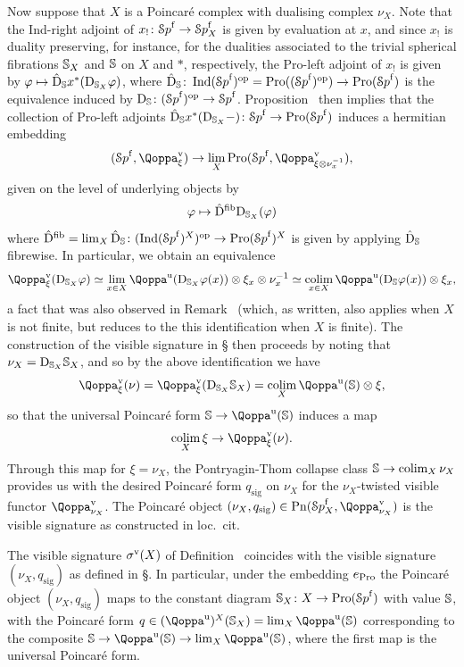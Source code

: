 Now suppose that $X$ is a Poincaré complex with dualising complex $\nu_X$. Note that the Ind-right adjoint of $x_!\colon {\mathcal Sp}^{\mathrm{f}} \to {\mathcal Sp}^{\mathrm{f}}_X$ is given by evaluation at $x$, and since $x_!$ is duality preserving, for instance, for the dualities associated to the trivial spherical fibrations $\mathbb{S}_X$ and $\mathbb{S}$ on $X$ and $*$, respectively, the Pro-left adjoint of $x_!$ is given by $\varphi \mapsto \hat{\mathrm{D}}_{\mathbb{S}}x^*(\mathrm{D}_{\mathbb{S}_X}\varphi)$, where $\hat{\mathrm{D}}_{\mathbb{S}}\colon \operatorname{Ind}({\mathcal Sp}^{\mathrm{f}})^\mathrm{op} = \operatorname{Pro}(({\mathcal Sp}^{\mathrm{f}})^\mathrm{op}) \to \operatorname{Pro}({\mathcal Sp}^{\mathrm{f}})$ is the equivalence induced by $\mathrm{D}_{\mathbb{S}}\colon ({\mathcal Sp}^{\mathrm{f}})^\mathrm{op} \to {\mathcal Sp}^{\mathrm{f}}$. Proposition~ then implies that the collection of Pro-left adjoints $\hat{\mathrm{D}}_{\mathbb{S}}x^*(\mathrm{D}_{\mathbb{S}_X}-)\colon {\mathcal Sp}^{\mathrm{f}} \to \operatorname{Pro}({\mathcal Sp}^{\mathrm{f}})$ induces a hermitian embedding
\[
(\Spaf,\QF^{\vis}_{\xi}) \to \lim_X \Pro(\Spaf,\QF^{\vis}_{\xi\otimes\nu_x^{-1}}) ,
\]
given on the level of underlying objects by
\begin{equation}
\label{equation:ind-to-pro}%
\vphi \mapsto \hat{\Dual}^{\fib}\Dual_{\SS_X}(\vphi) 
\end{equation}
where $\hat{\mathrm{D}}^{\operatorname{fib}} = \lim_X \hat{\mathrm{D}}_{\mathbb{S}}\colon (\operatorname{Ind}({\mathcal Sp}^{\mathrm{f}})^X)^\mathrm{op} \to \operatorname{Pro}({\mathcal Sp}^{\mathrm{f}})^X$ is given by applying $\hat{\mathrm{D}}_{\mathbb{S}}$ fibrewise.
In particular, we obtain an equivalence
\[
\QF^{\vis}_{\xi}(\Dual_{\SS_X}\vphi) \simeq \lim_{x \in X} \QF^{\uni}(\Dual_{\SS_X}\vphi(x))\otimes \xi_x \otimes \nu_x^{-1} \simeq \colim_{x \in X}\QF^{\uni}(\Dual_{\SS}\vphi(x))\otimes \xi_x,
\]
a fact that was also observed in Remark~ (which, as written, also applies when $X$ is not finite, but reduces to the this identification when $X$ is finite). The construction of the visible signature in \S{} then proceeds by noting that $\nu_X = \mathrm{D}_{\mathbb{S}_X}\mathbb{S}_X$, and so by the above identification we have
\[
\QF^{\vis}_{\xi}(\nu) = \QF^{\vis}_{\xi}(\Dual_{\SS_X}\SS_X) = \colim_{X}\QF^{\uni}(\SS)\otimes \xi ,
\]
so that the universal Poincaré form $\SS \to \QF^{\uni}(\SS)$ induces a map
\[
\colim_X \xi \to \QF^{\vis}_{\xi}(\nu) .
\]
Through this map for $\xi=\nu_X$, the Pontryagin-Thom collapse class $\mathbb{S}\to \mathop{\mathrm{colim}}_X \nu_X$ provides us with the desired Poincaré form $q_{\mathrm{sig}}$ on $\nu_X$ for the $\nu_X$-twisted visible functor $\QF^\vis_{\nu_X}$. The Poincaré object $(\nu_X,q_{\mathrm{sig}}) \in \Poinc(\Spaf_X,\QF^{\vis}_{\nu_X})$ is the visible signature as constructed in loc.\ cit.


\begin{proposition}
\label{proposition:visible-signature-revisited}%
The visible signature $\sigma^{\mathrm{v}}(X)$ of Definition~ coincides with the visible signature $(\nu_X,q_{\mathrm{sig}})$ as defined in \S{}.
In particular, under the embedding $e_{\operatorname{Pro}}$ the Poincaré object $(\nu_X,q_{\mathrm{sig}})$ maps to the constant diagram $\mathbb{S}_X\colon X \to \operatorname{Pro}({\mathcal Sp}^{\mathrm{f}})$ with value $\mathbb{S}$, with the Poincaré form $q \in (\QF^{\uni})^X(\SS_X) = \lim_X \QF^{\uni}(\SS)$ corresponding to the composite $\SS \to \QF^{\uni}(\SS) \to \lim_X \QF^{\uni}(\SS)$, where the first map is the universal Poincaré form.
\end{proposition}



